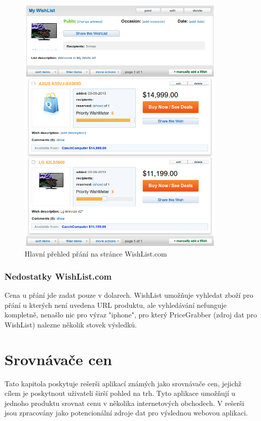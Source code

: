 \begin{figure}[htb]
\begin{center}
\includegraphics[width=100mm]{./pictures/wishlist-wishlist.png}
\caption{Hlavní přehled přání na stránce WishList.com}
\label{fig:wishlist-wishlist}
\end{center}
\end{figure}

\subsubsection{Nedostatky WishList.com}
Cena u přání jde zadat pouze v dolarech. WishList umožňuje vyhledat zboží pro přání u kterých není uvedena URL produktu, ale vyhledávání nefunguje kompletně, nenašlo nic pro výraz "iphone", pro který PriceGrabber (zdroj dat pro WishList) nalezne několik stovek výsledků.

\section{Srovnávače cen}
Tato kapitola poskytuje rešerši aplikací známých jako srovnávače cen, jejichž cílem je poskytnout uživateli širší pohled na trh. Tyto aplikace umožňují u jednoho produktu srovnat cenu v několika internetových obchodech. V rešerši jsou zpracovány jako potencionální zdroje dat pro výslednou webovou aplikaci.

